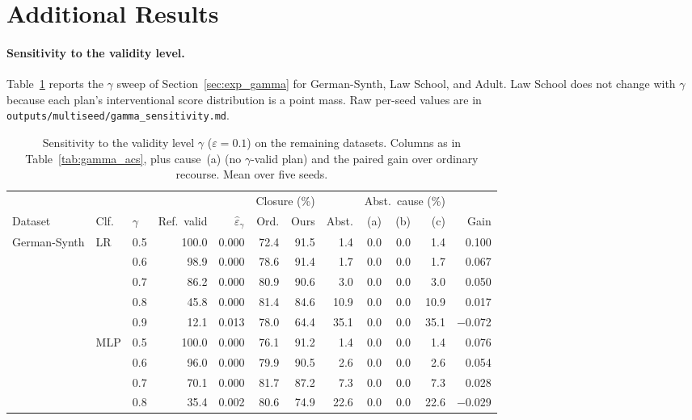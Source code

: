 \section{Additional Results}
\label{app:results}

\paragraph{Sensitivity to the validity level.}
Table~\ref{tab:gamma_all} reports the $\gamma$ sweep of
Section~\ref{sec:exp_gamma} for German-Synth, Law School, and Adult. Law
School does not change with $\gamma$ because each plan's interventional score
distribution is a point mass. Raw per-seed values are in
\texttt{outputs/multiseed/gamma\_sensitivity.md}.

\begin{table}[t]
\centering
\small
\caption{Sensitivity to the validity level $\gamma$ ($\varepsilon=0.1$) on the
remaining datasets. Columns as in Table~\ref{tab:gamma_acs}, plus cause~(a)
(no $\gamma$-valid plan) and the paired gain over ordinary recourse. Mean over
five seeds.}
\label{tab:gamma_all}
\setlength{\tabcolsep}{3.5pt}
\begin{tabular}{lllrrrrrrrrr}
\hline
& & & & & \multicolumn{2}{c}{Closure (\%)} & & \multicolumn{3}{c}{Abst.\ cause (\%)} & \\
Dataset & Clf. & $\gamma$ & Ref.\ valid & $\hat\varepsilon_\gamma$ & Ord. & Ours & Abst. & (a) & (b) & (c) & Gain \\
\hline
German-Synth & LR & 0.5 & 100.0 & 0.000 & 72.4 & 91.5 & 1.4 & 0.0 & 0.0 & 1.4 & 0.100 \\
 &  & 0.6 & 98.9 & 0.000 & 78.6 & 91.4 & 1.7 & 0.0 & 0.0 & 1.7 & 0.067 \\
 &  & 0.7 & 86.2 & 0.000 & 80.9 & 90.6 & 3.0 & 0.0 & 0.0 & 3.0 & 0.050 \\
 &  & 0.8 & 45.8 & 0.000 & 81.4 & 84.6 & 10.9 & 0.0 & 0.0 & 10.9 & 0.017 \\
 &  & 0.9 & 12.1 & 0.013 & 78.0 & 64.4 & 35.1 & 0.0 & 0.0 & 35.1 & $-$0.072 \\
\cline{2-12}
 & MLP & 0.5 & 100.0 & 0.000 & 76.1 & 91.2 & 1.4 & 0.0 & 0.0 & 1.4 & 0.076 \\
 &  & 0.6 & 96.0 & 0.000 & 79.9 & 90.5 & 2.6 & 0.0 & 0.0 & 2.6 & 0.054 \\
 &  & 0.7 & 70.1 & 0.000 & 81.7 & 87.2 & 7.3 & 0.0 & 0.0 & 7.3 & 0.028 \\
 &  & 0.8 & 35.4 & 0.002 & 80.6 & 74.9 & 22.6 & 0.0 & 0.0 & 22.6 & $-$0.029 \\

\end{tabular}
\end{table}
